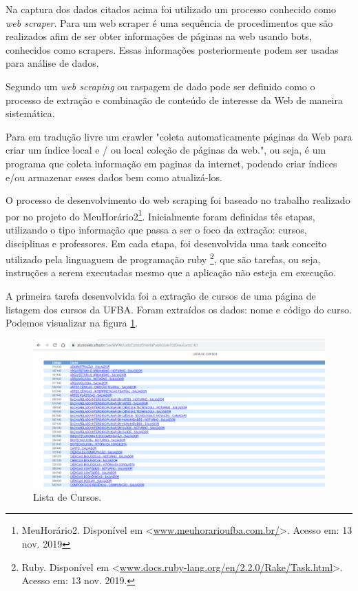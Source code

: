 \documentclass[12pt, a4paper]{report}
\begin{document}
Na captura dos dados citados acima foi utilizado um processo conhecido como  \textit{web scraper}. Para \cite{laender2002} um web scraper é uma sequência de procedimentos que são realizados afim de ser obter informações de páginas na web usando bots, conhecidos como scrapers. Essas informações posteriormente podem ser usadas para análise de dados.

Segundo \cite{Glezscraping2013} um \textit{web scraping} ou raspagem de dado pode ser definido como o processo de extração e combinação de conteúdo de
interesse da Web de maneira sistemática.

Para \cite[p. 1]{ilprints376} em tradução livre um crawler "coleta automaticamente páginas da Web para criar um índice local e / ou local coleção de páginas da web.", ou seja, é um programa que coleta informação em paginas da internet, podendo criar índices e/ou armazenar esses dados bem como atualizá-los. 

O processo de desenvolvimento do web scraping foi baseado no trabalho realizado por \citeauthor{assis2017meuhorario} no projeto do MeuHorário2\footnote{MeuHorário2. Disponível em <\url{www.meuhorarioufba.com.br/}>. Acesso em: 13 nov. 2019}. Inicialmente foram definidas tês etapas, utilizando o tipo informação que passa a ser o foco da extração: cursos, disciplinas e professores.  Em cada etapa, foi desenvolvida uma task conceito utilizado pela linguaguem de programação ruby \footnote{Ruby. Disponível em <\url{www.docs.ruby-lang.org/en/2.2.0/Rake/Task.html}>. Acesso em: 13 nov. 2019.}, que são tarefas, ou seja, instruções a serem executadas mesmo que a aplicação não esteja em execução. 

A primeira tarefa desenvolvida foi a extração de cursos de uma página de listagem dos cursos da UFBA. Foram extraídos os dados: nome e código do curso. Podemos visualizar na figura \ref{fig:lista_cursos}.

\begin{figure}
\centering
\includegraphics[scale=0.9]{lista_cursos.png}
\caption{Lista de Cursos.}
\label{fig:lista_cursos}
\end{figure}
\end{document}
